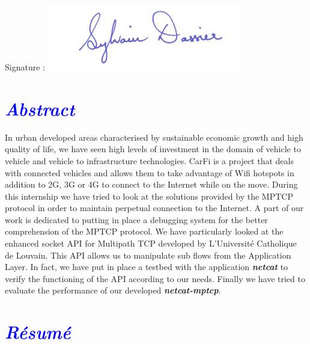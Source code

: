 \documentclass[a4paper,11pt]{article}
\begin{document}
	\vspace{-1cm}
	\hspace{5cm}
	Signature : \includegraphics[scale=0.5]{pictures/signa.jpg}
	
	\clearpage


	\section*{\Huge \textcolor{blue}{\textit{Abstract}}}
	
		\begin{description}
		
			\item \hspace{2cm} In urban developed areas characterised by sustainable economic growth and high quality of life, we have seen high levels of investment in the domain of vehicle to vehicle and vehicle to infrastructure technologies. CarFi is a project that deals with connected vehicles and allows them to take advantage of Wifi hotspots in addition to 2G, 3G or 4G to connect to the Internet while on the move. During this internship we have tried to look at the solutions provided by the MPTCP protocol in order to maintain perpetual connection to the Internet. A part of our work is dedicated to putting in place a debugging system for the better comprehension of the MPTCP protocol. We have particularly looked at the enhanced socket API for Multipath TCP developed by L'Université Catholique de Louvain. This API allows us to manipulate sub flows from the Application Layer. In fact, we have put in place a testbed with the application \textbf{\emph{netcat}} to verify the functioning of the API according to our needs. Finally we have tried to evaluate the performance of our developed \textbf{\emph{netcat-mptcp}}.
			
		\end{description}
		
	\section*{\Huge \textcolor{blue}{\textit{Résumé}}}
	
\end{document}
